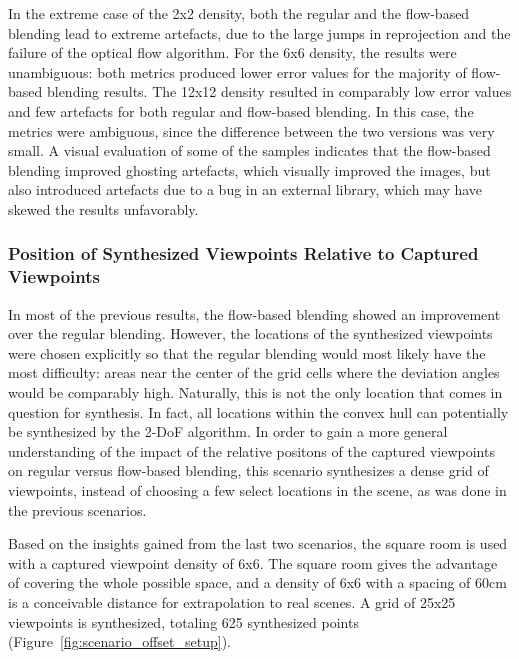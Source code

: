 In the extreme case of the 2x2 density, both the regular and the flow-based blending lead to extreme artefacts, due to the large jumps in reprojection and the failure of the optical flow algorithm.
For the 6x6 density, the results were unambiguous: both metrics produced lower error values for the majority of flow-based blending results.
The 12x12 density resulted in comparably low error values and few artefacts for both regular and flow-based blending. In this case, the metrics were ambiguous, since the difference between the two versions was very small. A visual evaluation of some of the samples indicates that the flow-based blending improved ghosting artefacts, which visually improved the images, but also introduced artefacts due to a bug in an external library, which may have skewed the results unfavorably.















\subsubsection{Position of Synthesized Viewpoints Relative to Captured Viewpoints}
In most of the previous results, the flow-based blending showed an improvement over the regular blending. However, the locations of the synthesized viewpoints were chosen explicitly so that the regular blending would most likely have the most difficulty: areas near the center of the grid cells where the deviation angles would be comparably high. Naturally, this is not the only location that comes in question for synthesis. In fact, all locations within the convex hull can potentially be synthesized by the 2-DoF algorithm. In order to gain a more general understanding of the impact of the relative positons of the captured viewpoints on regular versus flow-based blending, this scenario synthesizes a dense grid of viewpoints, instead of choosing a few select locations in the scene, as was done in the previous scenarios.

Based on the insights gained from the last two scenarios, the square room is used with a captured viewpoint density of 6x6. The square room gives the advantage of covering the whole possible space, and a density of 6x6 with a spacing of 60cm is a conceivable distance for extrapolation to real scenes. A grid of 25x25 viewpoints is synthesized, totaling 625 synthesized points (Figure~\ref{fig:scenario_offset_setup}).

